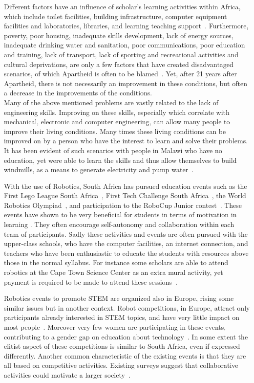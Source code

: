 \documentclass{intech-journal}
\begin{document}
Different factors have an influence of scholar's learning activities within Africa, which include toilet facilities, building infrastructure, computer equipment facilities and laboratories,  libraries, and learning teaching support~\cite{sedibe2011inequality}. 
Furthermore, poverty, poor housing, inadequate skills development, lack of energy sources, inadequate drinking water and sanitation, poor communications, poor education and training, lack of transport, lack of sporting and recreational activities and cultural deprivations, are only a few factors that have created disadvantaged scenarios, of which Apartheid is often to be blamed~\cite{mokoena2009improving}. 
Yet, after 21 years after Apartheid, there is not necessarily an improvement in these conditions, but often a decrease in the improvements of the conditions.
\\
\hspace{1cm}Many of the above mentioned problems are vastly related to the lack of engineering skills. 
Improving on these skills, especially which correlate with mechanical, electronic and computer engineering, can allow many people to improve their living conditions. 
Many times these living conditions can be improved on by a person who have the interest to learn and solve their problems. 
It has been evident of such scenarios with people in Malawi who have no education, yet were able to learn the skills and thus allow themselves to build windmills, as a means to generate electricity and pump water~\cite{Sheerin2009}.


With the use of Robotics, South Africa has pursued education events such as the First Lego League South Africa~\cite{FLLSA}, First Tech Challenge South Africa~\cite{FTCA}, the World Robotics Olympiad~\cite{WRO}, and participation to the RoboCup Junior contest~\cite{ferrein2011robocup}. 
These events have shown to be very beneficial for students in terms of motivation in learning \cite{deci1985intrinsic}. 
They often encourage self-autonomy and collaboration within each team of participants.
Sadly these activities and events are often pursued with the upper-class schools, who have the computer facilities, an internet connection, and teachers who have been enthusiastic to educate the students with resources above those in the normal syllabus. 
For instance some scholars are able to attend robotics at the Cape Town Science Center as an extra mural activity, yet payment is required to be made to attend these sessions~\cite{Capets}.

Robotics events to promote STEM are organized also in Europe, rising some similar issues but in another context.
Robot competitions, in Europe, attract only participants already interested in STEM topics, and have very little impact on most people~\cite{riedo2013upgrade}.
Moreover very few women are participating in these events, contributing to a gender gap on education about technology~\cite{riedo2013upgrade}.
In some extent the elitist aspect of these competitions is similar to South Africa, even if expressed differently.
Another common characteristic of the existing events is that they are all based on competitive activities. 
Existing surveys suggest that collaborative activities could motivate a larger society~\cite{riedo2013upgrade}.
\end{document}
